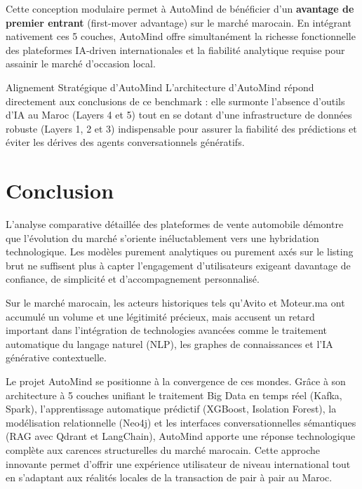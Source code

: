 \documentclass[11pt,a4paper]{article}
\begin{document}
Cette conception modulaire permet à AutoMind de bénéficier d'un \textbf{avantage de premier entrant} (first-mover advantage) sur le marché marocain. En intégrant nativement ces 5 couches, AutoMind offre simultanément la richesse fonctionnelle des plateformes IA-driven internationales et la fiabilité analytique requise pour assainir le marché d'occasion local.

\begin{insightbox}{Alignement Stratégique d'AutoMind}
L'architecture d'AutoMind répond directement aux conclusions de ce benchmark : elle surmonte l'absence d'outils d'IA au Maroc (Layers 4 et 5) tout en se dotant d'une infrastructure de données robuste (Layers 1, 2 et 3) indispensable pour assurer la fiabilité des prédictions et éviter les dérives des agents conversationnels génératifs.
\end{insightbox}

\newpage

\section{Conclusion}

L'analyse comparative détaillée des plateformes de vente automobile démontre que l'évolution du marché s'oriente inéluctablement vers une hybridation technologique. Les modèles purement analytiques ou purement axés sur le listing brut ne suffisent plus à capter l'engagement d'utilisateurs exigeant davantage de confiance, de simplicité et d'accompagnement personnalisé. 

Sur le marché marocain, les acteurs historiques tels qu'Avito et Moteur.ma ont accumulé un volume et une légitimité précieux, mais accusent un retard important dans l'intégration de technologies avancées comme le traitement automatique du langage naturel (NLP), les graphes de connaissances et l'IA générative contextuelle. 

Le projet AutoMind se positionne à la convergence de ces mondes. Grâce à son architecture à 5 couches unifiant le traitement Big Data en temps réel (Kafka, Spark), l'apprentissage automatique prédictif (XGBoost, Isolation Forest), la modélisation relationnelle (Neo4j) et les interfaces conversationnelles sémantiques (RAG avec Qdrant et LangChain), AutoMind apporte une réponse technologique complète aux carences structurelles du marché marocain. Cette approche innovante permet d'offrir une expérience utilisateur de niveau international tout en s'adaptant aux réalités locales de la transaction de pair à pair au Maroc.
\end{document}
